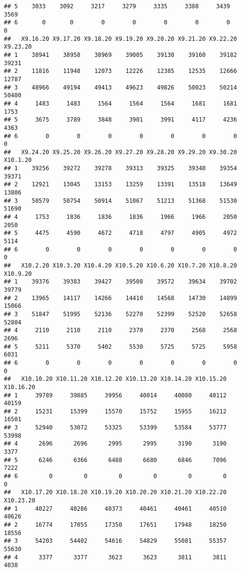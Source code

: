 \documentclass[
]{article}
\begin{document}
\begin{verbatim}
## 5    3033    3092     3217     3279     3335     3388     3439     3569
## 6       0       0        0        0        0        0        0        0
##   X9.16.20 X9.17.20 X9.18.20 X9.19.20 X9.20.20 X9.21.20 X9.22.20 X9.23.20
## 1    38941    38958    38969    39005    39130    39160    39182    39231
## 2    11816    11948    12073    12226    12385    12535    12666    12787
## 3    48966    49194    49413    49623    49826    50023    50214    50400
## 4     1483     1483     1564     1564     1564     1681     1681     1753
## 5     3675     3789     3848     3901     3991     4117     4236     4363
## 6        0        0        0        0        0        0        0        0
##   X9.24.20 X9.25.20 X9.26.20 X9.27.20 X9.28.20 X9.29.20 X9.30.20 X10.1.20
## 1    39256    39272    39278    39313    39325    39340    39354    39371
## 2    12921    13045    13153    13259    13391    13518    13649    13806
## 3    50579    50754    50914    51067    51213    51368    51530    51690
## 4     1753     1836     1836     1836     1966     1966     2050     2050
## 5     4475     4590     4672     4718     4797     4905     4972     5114
## 6        0        0        0        0        0        0        0        0
##   X10.2.20 X10.3.20 X10.4.20 X10.5.20 X10.6.20 X10.7.20 X10.8.20 X10.9.20
## 1    39376    39383    39427    39508    39572    39634    39702    39779
## 2    13965    14117    14266    14410    14568    14730    14899    15066
## 3    51847    51995    52136    52270    52399    52520    52658    52804
## 4     2110     2110     2110     2370     2370     2568     2568     2696
## 5     5211     5370     5402     5530     5725     5725     5958     6031
## 6        0        0        0        0        0        0        0        0
##   X10.10.20 X10.11.20 X10.12.20 X10.13.20 X10.14.20 X10.15.20 X10.16.20
## 1     39789     39885     39956     40014     40080     40112     40159
## 2     15231     15399     15570     15752     15955     16212     16501
## 3     52940     53072     53325     53399     53584     53777     53998
## 4      2696      2696      2995      2995      3190      3190      3377
## 5      6246      6366      6488      6680      6846      7096      7222
## 6         0         0         0         0         0         0         0
##   X10.17.20 X10.18.20 X10.19.20 X10.20.20 X10.21.20 X10.22.20 X10.23.20
## 1     40227     40286     40373     40461     40461     40510     40626
## 2     16774     17055     17350     17651     17948     18250     18556
## 3     54203     54402     54616     54829     55081     55357     55630
## 4      3377      3377      3623      3623      3811      3811      4038

\end{verbatim}
\end{document}
